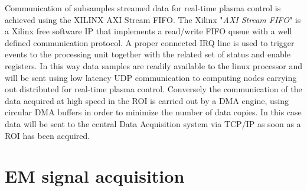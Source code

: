 Communication of subsamples streamed data for real-time plasma control is achieved using the XILINX AXI Stream FIFO. The Xilinx "\textit{AXI Stream FIFO}" is a Xilinx free software IP that implements a read/write FIFO queue with a well defined communication protocol. A proper connected IRQ line is used to trigger events to the processing unit together with the related set of status and enable registers. In this way data samples are readily available to the linux processor and will be sent using low latency UDP communication to computing nodes carrying out distributed for real-time plasma control. 
Conversely the communication of the data acquired at high speed in the ROI is carried out by a DMA engine, using circular DMA buffers in order to minimize the number of data copies. In this case data will be sent to the central Data Acquisition system via TCP/IP as soon as a ROI has been acquired.





\section{ EM signal acquisition }

